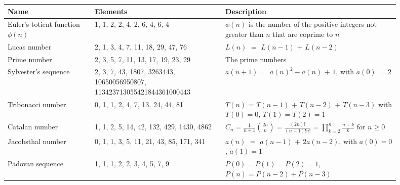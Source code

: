 
\begin{tabular}{p{0.2\linewidth}|p{0.3\linewidth} | p{0.4\linewidth}}
	Name & Elements & Description \\
	\hline
	Euler's totient function $\phi(n)$ & 1, 1, 2, 2, 4, 2, 6, 4, 6, 4 & $\phi(n)$ is the number of the positive integers not
greater than $n$ that are coprime to $n$ \\
	\hline
	Lucas number & 2, 1, 3, 4, 7, 11, 18, 29, 47, 76 & $L(n)$ $=$ $L(n - 1)$ $+$ $L(n - 2)$ \\
	\hline
	Prime number & 2, 3, 5, 7, 11, 13, 17, 19, 23, 29 & The prime numbers \\
	\hline
	Sylvester's sequence & 2, 3, 7, 43, 1807, 3263443, 10650056950807, 113423713055421844361000443 & $a(n + 1) =$ $a(n)^2 - a(n)$ $+$ $1$, with $a(0)$ $= 2$ \\
	\hline
	Tribonacci number & 0, 1, 1, 2, 4, 7, 13, 24, 44, 81 & $T(n)$ = $T(n - 1)$ + $T(n - 2)$ + $T(n - 3)$ with $T(0) = 0$, $T(1) = T(2) = 1$ \\
	\hline
	Catalan number & 1, 1, 2, 5, 14, 42, 132, 429, 1430, 4862 & $C_n = \frac{1}{n+1} {{2n} \choose {n}}$$= \frac{(2n)!}{(n+1)!n!}$$= \prod\limits_{k = 2}^n \frac{n+k}{k}$ for $n \ge 0$\\
	\hline
	Jacobsthal number & 0, 1, 1, 3, 5, 11, 21, 43, 85, 171, 341 & $a(n)$ $=$ $a(n - 1)$ $+$ $2a(n - 2)$, with $a(0) = 0$, $a(1) = 1$ \\
	\hline
	Padovan sequence & 1, 1, 1, 2, 2, 3, 4, 5, 7, 9 & $P(0) = P(1) = P(2) = 1$, $P(n) = P(n-2)+P(n-3)$ \\
\end{tabular}